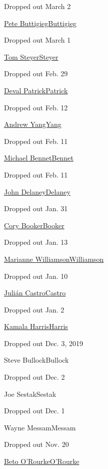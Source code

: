 Dropped out March 2

\href{https://www.nytimes3xbfgragh.onion/interactive/2020/us/elections/pete-buttigieg.html}{Pete
ButtigiegButtigieg}

Dropped out March 1

\href{https://www.nytimes3xbfgragh.onion/interactive/2020/us/elections/tom-steyer.html}{Tom
SteyerSteyer}

Dropped out Feb. 29

\href{https://www.nytimes3xbfgragh.onion/interactive/2020/us/elections/deval-patrick.html}{Deval
PatrickPatrick}

Dropped out Feb. 12

\href{https://www.nytimes3xbfgragh.onion/interactive/2020/us/elections/andrew-yang.html}{Andrew
YangYang}

Dropped out Feb. 11

\href{https://www.nytimes3xbfgragh.onion/interactive/2020/us/elections/michael-bennet.html}{Michael
BennetBennet}

Dropped out Feb. 11

\href{https://www.nytimes3xbfgragh.onion/interactive/2020/us/elections/john-delaney.html}{John
DelaneyDelaney}

Dropped out Jan. 31

\href{https://www.nytimes3xbfgragh.onion/interactive/2020/us/elections/cory-booker.html}{Cory
BookerBooker}

Dropped out Jan. 13

\href{https://www.nytimes3xbfgragh.onion/interactive/2020/us/elections/marianne-williamson.html}{Marianne
WilliamsonWilliamson}

Dropped out Jan. 10

\href{https://www.nytimes3xbfgragh.onion/interactive/2020/us/elections/julian-castro.html}{Julián
CastroCastro}

Dropped out Jan. 2

\href{https://www.nytimes3xbfgragh.onion/interactive/2020/us/elections/kamala-harris.html}{Kamala
HarrisHarris}

Dropped out Dec. 3, 2019

Steve BullockBullock

Dropped out Dec. 2

Joe SestakSestak

Dropped out Dec. 1

Wayne MessamMessam

Dropped out Nov. 20

\href{https://www.nytimes3xbfgragh.onion/interactive/2020/us/elections/beto-orourke.html}{Beto
O'RourkeO'Rourke}

